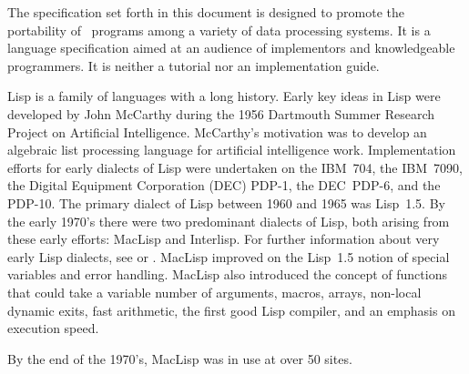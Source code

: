 

 The specification set forth in this document is designed to promote the portability of \clisp\ programs among a variety of data processing systems. It is a language specification aimed at an audience of implementors and knowledgeable programmers. It is neither a tutorial nor an implementation guide. \endsubSection%

  Lisp is a family of languages with a long history.  Early key ideas in Lisp were developed by John McCarthy during the 1956 Dartmouth Summer Research Project on Artificial Intelligence.  McCarthy's motivation was to develop an algebraic list processing language for artificial intelligence work. Implementation efforts for early dialects of Lisp were undertaken on the IBM~704, the IBM~7090, the Digital Equipment Corporation (DEC) PDP-1, the DEC~PDP-6, and the PDP-10. The primary dialect of Lisp between 1960 and 1965 was Lisp~1.5. By the early 1970's there were two predominant dialects of Lisp, both arising from these early efforts: MacLisp and Interlisp. For further information about very early Lisp dialects,  see {\AnatomyOfLisp} or {\LispOnePointFive}.
  MacLisp improved on the Lisp~1.5 notion of special variables and error handling. MacLisp also introduced the concept of functions that could take a variable number of arguments, macros, arrays, non-local dynamic exits, fast arithmetic, the first good Lisp compiler, and an emphasis on execution speed. 

By the end of the 1970's, MacLisp was in use at over 50 sites.

